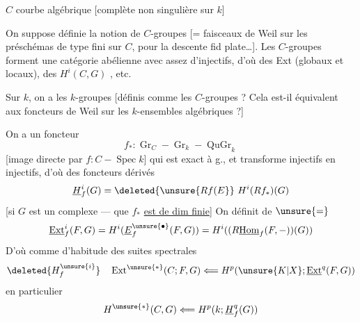 
$C$ courbe algébrique [complète non singulière sur $k$]

 On suppose définie la notion de $C$-groupes [= faisceaux de Weil sur les préschémas de  type fini sur $C$, pour la descente fid plate\ldots].  Les $C$-groupes forment une catégorie abélienne avec assez d'injectifs, d'où des Ext (globaux et locaux), des $H^i(C,G)$ , etc.

Sur $k$, on a les $k$-groupes [définis comme les $C$-groupes ? Cela est-il équivalent aux foncteurs de Weil  sur les  $k$-ensembles algébriques ?]

On a un foncteur 
\[
f_*:\operatorname{Gr}_C\mathrel{-}\operatorname{Gr}_k\mathrel{-}\operatorname{QuGr}_k
\]
[image directe par $f:C\mathrel{-}\operatorname{Spec}k$] qui est exact à g.,  et transforme injectifs en injectifs, d'où des foncteurs dérivés
\[
\underline H^i_f(G)=\deleted{\unsure{Rf(E}}\ H^i(Rf_*)(G)
\]
[si $G$ est un complexe    ---  que $f_*$ \uline{est de dim  finie}] On définit de $\unsure{=}$
\[
\underline{\operatorname{Ext}}^i_f(F,G)=H^i(\underline E^{\unsure{\bullet}}_f(F,G))
=H^i((R\underline{\operatorname{Hom}}_f(F,-))(G))
\]
D'où comme d'habitude des suites spectrales
\[
\deleted{H^{\unsure{i}}_f}\quad\operatorname{Ext}^{\unsure{*}}(C;F,G)
\Longleftarrow H^p(\unsure{K|X};\underline{\operatorname{Ext}}^q(F,G))
\]
en particulier
\[
H^{\unsure{*}}(C,G)\Longleftarrow H^p(k;\underline H^q_f(G))
\]

